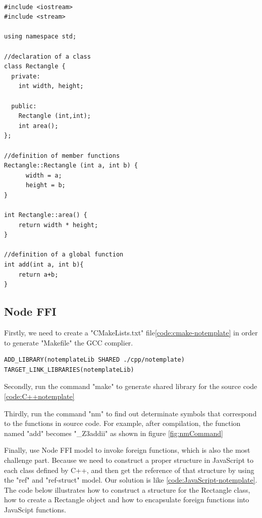 \lstset{language=C++}
\label{code:C++notemplate}
\begin{lstlisting}

#include <iostream>
#include <stream>

using namespace std;

//declaration of a class
class Rectangle {
  private:
    int width, height;

  public:
    Rectangle (int,int);
    int area();
};

//definition of member functions
Rectangle::Rectangle (int a, int b) {
	  width = a;
	  height = b;
}

int Rectangle::area() {
    return width * height;
}

//definition of a global function
int add(int a, int b){
    return a+b;
}

\end{lstlisting}

\subsection{Node FFI}
Firstly, we need to create a "CMakeLists.txt" file\ref{code:cmake-notemplate} in order to generate "Makefile" the GCC complier. 

\label{code:cmake-notemplate}
\begin{lstlisting}
ADD_LIBRARY(notemplateLib SHARED ./cpp/notemplate)
TARGET_LINK_LIBRARIES(notemplateLib)
\end{lstlisting}
       
Secondly, run the command "make" to generate shared library for the source code \ref{code:C++notemplate}

Thirdly, run the command "nm" to find out determinate symbols that correspond to the functions in source code. For example, after compilation, the function named "add" becomes "\_Z3addii" as shown in figure \ref{fig:nmCommand}

Finally, use Node FFI model to invoke foreign functions, which is also the most challenge part. Because we need to construct a proper structure in JavaScript to each class defined by C++, and then get the reference of that structure by using the "ref" and "ref-struct" model. Our solution is like \ref{code:JavaScript-notemplate}. The code below illustrates how to construct a structure for the Rectangle class, how to create a Rectangle object and how to encapsulate foreign functions into JavaScipt functions.


\label{code:JavaScript-notemplate}

